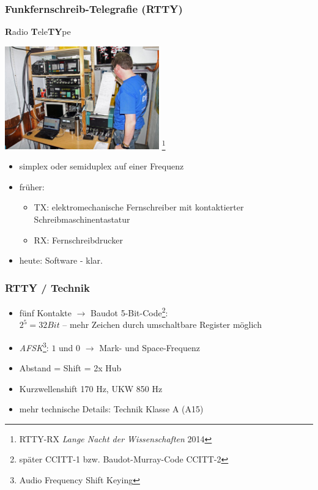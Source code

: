 \begin{frame}
    \frametitle{Funkfernschreib-Telegrafie (RTTY)}

    \textbf{R}adio \textbf{T}ele\textbf{TY}pe

    \begin{center}
        \includegraphics[width=0.5\textwidth,height=.35\textheight,keepaspectratio]{e16/RTTY_LNDW2014.jpg}
        \footnote{RTTY-RX \emph{Lange Nacht der Wissenschaften} 2014}
    \end{center}


    \begin{itemize}
        \item simplex oder semiduplex auf einer Frequenz
        \item früher:
            \begin{itemize}
                \item TX: elektromechanische Fernschreiber mit kontaktierter
                      Schreibmaschinentastatur
                \item RX: Fernschreibdrucker
            \end{itemize}
        \item heute: Software - klar.
    \end{itemize}

\end{frame}

\begin{frame}
    \frametitle{RTTY / Technik}

    \begin{itemize}
        \item fünf Kontakte $\rightarrow$ Baudot 5-Bit-Code\footnote{später
              CCITT-1 bzw. Baudot-Murray-Code CCITT-2}: \\
              $2^5 = 32 Bit$ -- mehr
              Zeichen durch umschaltbare Register möglich
        \item \emph{AFSK}\footnote{Audio Frequency Shift Keying}:
              $1$ und $0$ $\rightarrow$ Mark- und Space-Frequenz
        \item Abstand = Shift = 2x Hub
        \item Kurzwellenshift 170 Hz, UKW 850 Hz
        \item mehr technische Details: Technik Klasse A (A15)
    \end{itemize}

\end{frame}

